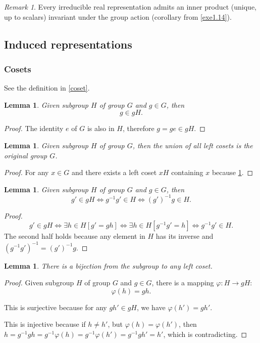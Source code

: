 \documentclass[12pt, letterpaper]{article}
\newtheorem{lem}[prop]{Lemma}
\theoremstyle{definition}
\theoremstyle{remark}
\newtheorem*{rem*}{Remark}
\theoremstyle{definition}
\theoremstyle{plain}
\numberwithin{equation}{section}
\begin{document}
	\begin{rem*}
		Every irreducible real representation
		admits an inner product (unique, up to scalars) invariant under the group 
		action (corollary from \ref{exe1.14}).
	\end{rem*}

	\subsection{Induced representations}
	\subsubsection{Cosets}
	
	See the definition in \ref{coset}.
	
	\begin{lem}\label{lemgingH}
		Given subgroup $H$ of group $G$ and $g\in G$,
		then \[ g\in gH. \]
	\end{lem}
	\begin{proof}
		The identity $e$ of $G$ is also in $H$,
		therefore $g=ge\in gH$.
	\end{proof}
	
	\begin{lem}\label{lemCosetsCoverAll}
		Given subgroup $H$ of group $G$,
		then the union of all left cosets is the original group $G$.
	\end{lem}
	\begin{proof}
		For any $x\in G$ and there exists a left coset $xH$ 
		containing $x$ because \ref{lemgingH}.
	\end{proof}

	\begin{lem}\label{lemCosetToSubGrp}
		Given subgroup $H$ of group $G$ and $g\in G$,
		then \[ g'\in gH\iff g^{-1}g'\in H \iff (g')^{-1}g\in H. \]
	\end{lem}
	\begin{proof}
		\[g'\in gH\iff \exists h\in H[g'=gh] \iff \exists h \in H[g^{-1}g'=h]\iff g^{-1}g'\in H.\]
		The second half holds because any element in $H$ has its inverse
		and $(g^{-1}g')^{-1}=(g')^{-1}g$.
	\end{proof}
	
	\begin{lem}\label{lemSubGrpBijecCoset}
		There is a bijection from the subgroup to any left coset.
	\end{lem}
	\begin{proof}
		Given subgroup $H$ of group $G$ and $g\in G$,
		there is a mapping $\varphi\colon H\to gH$:
		\[\varphi(h)=gh. \]
		
		This is surjective because for any $gh'\in gH$,
		we have $\varphi(h')=gh'$.
		
		This is injective because if $h\ne h'$, but $\varphi(h)=\varphi(h')$,
		then $h=g^{-1}gh=g^{-1}\varphi(h)=g^{-1}\varphi(h')=g^{-1}gh'=h'$, which is contradicting.

	\end{proof}
	
\end{document}
